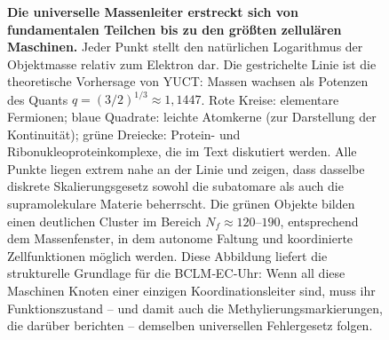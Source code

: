 \documentclass[12pt,a4paper]{article}
\begin{document}
\begin{figure}[H]
		\caption{\textbf{Die universelle Massenleiter erstreckt sich von fundamentalen Teilchen bis zu den größten zellulären Maschinen.} 
			Jeder Punkt stellt den natürlichen Logarithmus der Objektmasse relativ zum Elektron dar. 
			Die gestrichelte Linie ist die theoretische Vorhersage von YUCT: Massen wachsen als Potenzen des Quants \(q = (3/2)^{1/3} \approx 1,1447\). 
			Rote Kreise: elementare Fermionen; blaue Quadrate: leichte Atomkerne (zur Darstellung der Kontinuität); grüne Dreiecke: Protein- und Ribonukleoproteinkomplexe, die im Text diskutiert werden. 
			Alle Punkte liegen extrem nahe an der Linie und zeigen, dass dasselbe diskrete Skalierungsgesetz sowohl die subatomare als auch die supramolekulare Materie beherrscht. 
			Die grünen Objekte bilden einen deutlichen Cluster im Bereich \(N_f \approx 120\)--\(190\), entsprechend dem Massenfenster, in dem autonome Faltung und koordinierte Zellfunktionen möglich werden. 
			Diese Abbildung liefert die strukturelle Grundlage für die BCLM‑EC‑Uhr: Wenn all diese Maschinen Knoten einer einzigen Koordinationsleiter sind, muss ihr Funktionszustand -- und damit auch die Methylierungsmarkierungen, die darüber berichten -- demselben universellen Fehlergesetz folgen.}
		\label{fig:mass_ladder_bclm}
	\end{figure}
	
\end{document}
